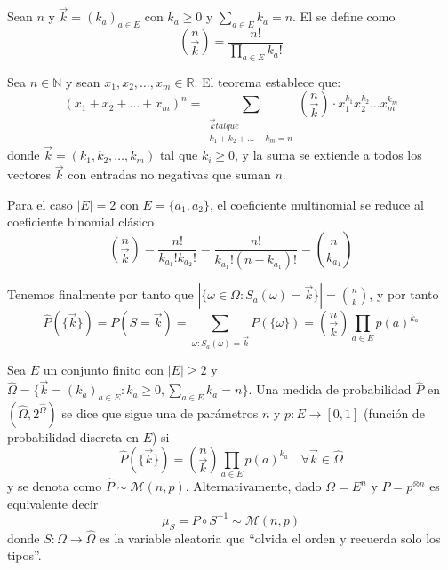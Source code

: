 \begin{definicion}
    Sean $n$ y $\vec{k}=(k_a)_{a\in E}$ con $k_a \geq 0$ y $\sum\limits_{a\in E} k_a = n$. El  se define como
    \begin{equation*}
        \binom{n}{\vec{k}} = \dfrac{n!}{\prod\limits_{a \in E} k_a!}
    \end{equation*}
\end{definicion}

\begin{teo}
    Sea $n \in \mathbb{N}$ y sean $x_1, x_2, \ldots, x_m \in \mathbb{R}$. El teorema establece que:$$(x_1 + x_2 + \dots + x_m)^n = \sum_{\substack{\vec{k} tal que \\ k_1 + k_2 + \dots + k_m = n}} \binom{n}{\vec{k}} \cdot x_1^{k_1} x_2^{k_2} \dots x_m^{k_m}$$
    donde $\vec{k}=(k_1, k_2, \ldots, k_m)$ tal que $k_i\geq 0$, y la suma se extiende a todos los vectores $\vec{k}$ con entradas no negativas que suman $n$. \\
\end{teo}

\begin{observacion}
    Para el caso $|E|=2$ con $E=\{a_1, a_2\}$, el coeficiente multinomial se reduce al coeficiente binomial clásico
    \begin{equation*}
        \binom{n}{\vec{k}} = \dfrac{n!}{k_{a_1}! k_{a_2}!} = \dfrac{n!}{k_{a_1}! (n - k_{a_1})!} = \binom{n}{k_{a_1}}
    \end{equation*}
\end{observacion}

\noindent
Tenemos finalmente por tanto que $|\{\omega\in \Omega: S_a(\omega)=\vec{k}\}| = \binom{n}{\vec{k}}$, y por tanto
\begin{equation*}
    \hat{P}(\{\vec{k}\}) = P(S=\vec{k}) = \sum_{\omega: S_a(\omega)=\vec{k}} P(\{\omega\}) = \binom{n}{\vec{k}} \prod_{a\in E} p(a)^{k_a}
\end{equation*}

\begin{definicion}
    Sea $E$ un conjunto finito con $|E| \geq 2$ y $\hat{\Omega} = \{\vec{k}=(k_a)_{a\in E}: k_a \geq 0, \sum\limits_{a\in E} k_a = n\}$. Una medida de probabilidad $\hat{P}$ en $(\hat{\Omega}, 2^{\hat{\Omega}})$ se dice que sigue una  de parámetros $n$ y $p:E\to [0,1]$ (función de probabilidad discreta en $E$) si
    \begin{equation*}
        \hat{P}(\{\vec{k}\}) = \binom{n}{\vec{k}} \prod_{a\in E} p(a)^{k_a} \quad \forall \vec{k} \in \hat{\Omega}
    \end{equation*}
    y se denota como $\hat{P} \sim \mathcal{M}(n, p)$. Alternativamente, dado $\Omega=E^n$ y $P=p^{\otimes n}$ es equivalente decir
    \begin{equation*}
        \mu_S=P\circ S^{-1} \sim \mathcal{M}(n, p)
    \end{equation*}
    donde $S:\Omega \to \hat{\Omega}$ es la variable aleatoria que ``olvida el orden y recuerda solo los tipos''.
\end{definicion}

